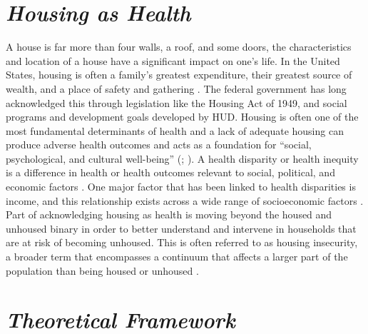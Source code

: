  

 

\section{\textit{Housing as Health}} 

 

A house is far more than four walls, a roof, and some doors, the characteristics and location of a house have a significant impact on one’s life. In the United States, housing is often a family’s greatest expenditure, their greatest source of wealth, and a place of safety and gathering \citep{braveman_housing_2011}. The federal government has long acknowledged this through legislation like the Housing Act of 1949, and social programs and development goals developed by HUD. Housing is often one of the most fundamental determinants of health and a lack of adequate housing can produce adverse health outcomes and acts as a foundation for “social, psychological, and cultural well-being” (\citealp{dalessandro_housing_2020}; \citealp{leifheit_building_2022}). A health disparity or health inequity is a difference in health or health outcomes relevant to social, political, and economic factors \citep{lutfiyya_rurality_2012}. One major factor that has been linked to health disparities is income, and this relationship exists across a wide range of socioeconomic factors \citep{canto_rural_2014}. Part of acknowledging housing as health is moving beyond the housed and unhoused binary in order to better understand and intervene in households that are at risk of becoming unhoused. This is often referred to as housing insecurity, a broader term that encompasses a continuum that affects a larger part of the population than being housed or unhoused \citep{deluca_housing_2022}. 

 

\section{\textit{Theoretical Framework}} 

 

